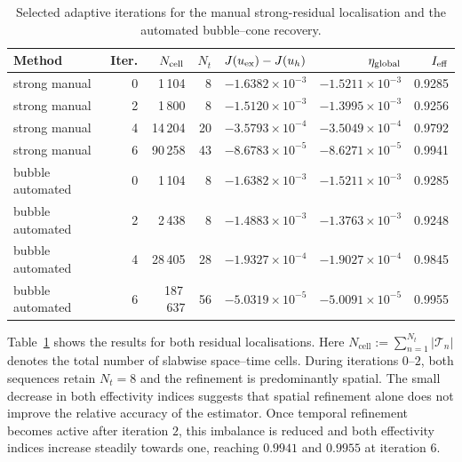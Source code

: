 \begin{table}[h]
\centering
\small
\begin{tabular}{lrrrrrr}
\toprule
Method & Iter. & $N_{\rm cell}$ & $N_t$
& $J(u_{\rm ex})-J(u_h)$
& $\eta_{\rm global}$
& $I_{\rm eff}$ \\
\midrule
strong manual
& 0 & 1\,104 & 8
& $-1.6382\times10^{-3}$
& $-1.5211\times10^{-3}$
& 0.9285 \\

strong manual
& 2 & 1\,800 & 8
& $-1.5120\times10^{-3}$
& $-1.3995\times10^{-3}$
& 0.9256 \\

strong manual
& 4 & 14\,204 & 20
& $-3.5793\times10^{-4}$
& $-3.5049\times10^{-4}$
& 0.9792 \\

strong manual
& 6 & 90\,258 & 43
& $-8.6783\times10^{-5}$
& $-8.6271\times10^{-5}$
& 0.9941 \\

\midrule
bubble automated
& 0 & 1\,104 & 8
& $-1.6382\times10^{-3}$
& $-1.5211\times10^{-3}$
& 0.9285 \\

bubble automated
& 2 & 2\,438 & 8
& $-1.4883\times10^{-3}$
& $-1.3763\times10^{-3}$
& 0.9248 \\

bubble automated
& 4 & 28\,405 & 28
& $-1.9327\times10^{-4}$
& $-1.9027\times10^{-4}$
& 0.9845 \\

bubble automated
& 6 & 187\,637 & 56
& $-5.0319\times10^{-5}$
& $-5.0091\times10^{-5}$
& 0.9955 \\
\bottomrule
\end{tabular}
\caption{Selected adaptive iterations for the manual strong-residual
localisation and the automated bubble--cone recovery.}
\label{tab:moving-hill-selected-iterations}
\end{table}


Table~\ref{tab:moving-hill-selected-iterations} shows the results for both residual localisations. Here \(N_{\mathrm{cell}}:=\sum_{n=1}^{N_t}|\mathcal T_n|\) denotes the total number of slabwise space–time cells. During iterations \(0\)--\(2\), both sequences retain \(N_t=8\) and the refinement is predominantly spatial. The small decrease in both effectivity indices suggests that spatial refinement alone does not improve the relative accuracy of the estimator. Once temporal refinement becomes active after iteration \(2\), this imbalance is reduced and both effectivity indices increase steadily towards one, reaching \(0.9941\) and \(0.9955\) at iteration \(6\).

